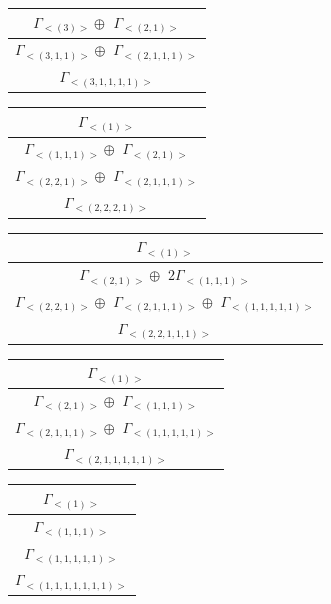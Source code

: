 \begin{minipage}{.3\textwidth}
\centering
\begin{tabular}{|c|}\hline
$\Gamma_{<(
3
)>} \oplus$
$\Gamma_{<(
2 , 
1
)>}$
\\ \hline
$\Gamma_{<(
3 , 
1 , 
1
)>} \oplus$
$\Gamma_{<(
2 , 
1 , 
1 , 
1
)>}$
\\ \hline
$\Gamma_{<(
3 , 
1 , 
1 , 
1 , 
1
)>}$
\\
\hline\end{tabular}\end{minipage}
\bigskip
\begin{minipage}{.3\textwidth}
\centering
\begin{tabular}{|c|}\hline
$\Gamma_{<(
1
)>}$
\\ \hline
$\Gamma_{<(
1 , 
1 , 
1
)>} \oplus$
$\Gamma_{<(
2 , 
1
)>}$
\\ \hline
$\Gamma_{<(
2 , 
2 , 
1
)>} \oplus$
$\Gamma_{<(
2 , 
1 , 
1 , 
1
)>}$
\\ \hline
$\Gamma_{<(
2 , 
2 , 
2 , 
1
)>}$
\\
\hline\end{tabular}\end{minipage}
\begin{minipage}{.5\textwidth}
\centering
\begin{tabular}{|c|}\hline
$\Gamma_{<(
1
)>}$
\\ \hline
$\Gamma_{<(
2 , 
1
)>} \oplus$
$ 2 \Gamma_{<(
1 , 
1 , 
1
)>}$
\\ \hline
$\Gamma_{<(
2 , 
2 , 
1
)>} \oplus$
$\Gamma_{<(
2 , 
1 , 
1 , 
1
)>} \oplus$
$\Gamma_{<(
1 , 
1 , 
1 , 
1 , 
1
)>}$
\\ \hline
$\Gamma_{<(
2 , 
2 , 
1 , 
1 , 
1
)>}$
\\
\hline\end{tabular}\end{minipage}
\begin{minipage}{.3\textwidth}
\centering
\begin{tabular}{|c|}\hline
$\Gamma_{<(
1
)>}$
\\ \hline
$\Gamma_{<(
2 , 
1
)>} \oplus$
$\Gamma_{<(
1 , 
1 , 
1
)>}$
\\ \hline
$\Gamma_{<(
2 , 
1 , 
1 , 
1
)>} \oplus$
$\Gamma_{<(
1 , 
1 , 
1 , 
1 , 
1
)>}$
\\ \hline
$\Gamma_{<(
2 , 
1 , 
1 , 
1 , 
1 , 
1
)>}$
\\
\hline\end{tabular}\end{minipage}
\begin{minipage}{1\textwidth}
\centering
\begin{tabular}{|c|}\hline
$\Gamma_{<(
1
)>}$
\\ \hline
$\Gamma_{<(
1 , 
1 , 
1
)>}$
\\ \hline
$\Gamma_{<(
1 , 
1 , 
1 , 
1 , 
1
)>}$
\\ \hline
$\Gamma_{<(
1 , 
1 , 
1 , 
1 , 
1 , 
1 , 
1
)>}$
\\
\hline\end{tabular}\end{minipage}
\\




